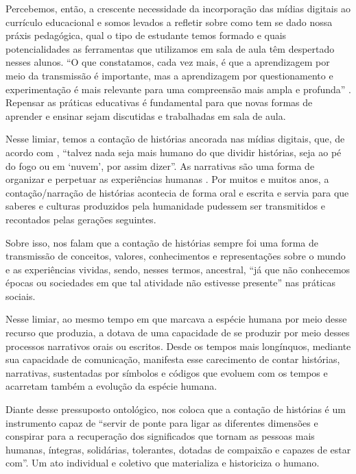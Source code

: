 \documentclass[portuguese]{textolivre}
\begin{document}
Percebemos, então, a crescente necessidade da incorporação das mídias digitais ao currículo educacional e somos levados a refletir sobre como tem se dado nossa práxis pedagógica, qual o tipo de estudante temos formado e quais potencialidades as ferramentas que utilizamos em sala de aula têm despertado nesses alunos. “O que constatamos, cada vez mais, é que a aprendizagem por meio da transmissão é importante, mas a aprendizagem por questionamento e experimentação é mais relevante para uma compreensão mais ampla e profunda” \cite[p.~37]{moran2015mudando}. Repensar as práticas educativas é fundamental para que novas formas de aprender e ensinar sejam discutidas e trabalhadas em sala de aula.

Nesse limiar, temos a contação de histórias ancorada nas mídias digitais, que, de acordo com \textcite[p.~25]{jenkins2015cultura}, “talvez nada seja mais humano do que dividir histórias, seja ao pé do fogo ou em ‘nuvem’, por assim dizer”. As narrativas são uma forma de organizar e perpetuar as experiências humanas \cite{bruner1991construcao}. Por muitos e muitos anos, a contação/narração de histórias acontecia de forma oral e escrita e servia para que saberes e culturas produzidos pela humanidade pudessem ser transmitidos e recontados pelas gerações seguintes.

Sobre isso, \textcite[p.~222]{valenca2019storytelling} nos falam que a contação de histórias sempre foi uma forma de transmissão de conceitos, valores, conhecimentos e representações sobre o mundo e as experiências vividas, sendo, nesses termos, ancestral, “já que não conhecemos épocas ou sociedades em que tal atividade não estivesse presente” nas práticas sociais.

Nesse limiar, ao mesmo tempo em que marcava a espécie humana por meio desse recurso que produzia, a dotava de uma capacidade de se produzir por meio desses processos narrativos orais ou escritos. Desde os tempos mais longínquos, mediante sua capacidade de comunicação, manifesta esse carecimento de contar histórias, narrativas, sustentadas por símbolos e códigos que evoluem com os tempos e acarretam também a evolução da espécie humana.

Diante desse pressuposto ontológico, \textcite[p.~9]{busatto2005narrando} nos coloca que a contação de histórias é um instrumento capaz de “servir de ponte para ligar as diferentes dimensões e conspirar para a recuperação dos significados que tornam as pessoas mais humanas, íntegras, solidárias, tolerantes, dotadas de compaixão e capazes de estar com”. Um ato individual e coletivo que materializa e historiciza o humano.
\end{document}

